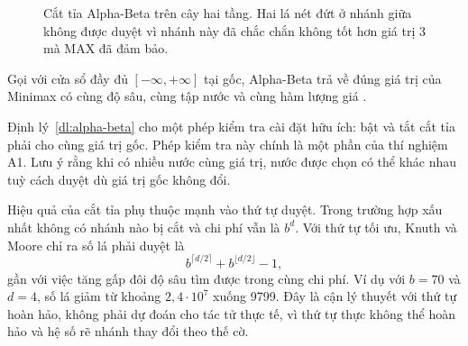 \begin{figure}[!htb]
  \centering
  \caption{Cắt tỉa Alpha-Beta trên cây hai tầng. Hai lá nét đứt ở nhánh giữa không được duyệt vì nhánh này đã chắc chắn không tốt hơn giá trị 3 mà MAX đã đảm bảo.}
  \label{fig:lt-cat-tia}
\end{figure}

\begin{dinhly}
\label{dl:alpha-beta}
Gọi với cửa sổ đầy đủ $[-\infty, +\infty]$ tại gốc, Alpha-Beta trả về đúng giá trị của Minimax có cùng độ sâu, cùng tập nước và cùng hàm lượng giá \cite{knuth1975alphabeta}.
\end{dinhly}

Định lý~\ref{dl:alpha-beta} cho một phép kiểm tra cài đặt hữu ích: bật và tắt cắt tỉa phải cho cùng giá trị gốc. Phép kiểm tra này chính là một phần của thí nghiệm A1. Lưu ý rằng khi có nhiều nước cùng giá trị, nước được chọn có thể khác nhau tuỳ cách duyệt dù giá trị gốc không đổi.

Hiệu quả của cắt tỉa phụ thuộc mạnh vào thứ tự duyệt. Trong trường hợp xấu nhất không có nhánh nào bị cắt và chi phí vẫn là $b^d$. Với thứ tự tối ưu, Knuth và Moore \cite{knuth1975alphabeta} chỉ ra số lá phải duyệt là
\begin{equation}
  b^{\lceil d/2 \rceil} + b^{\lfloor d/2 \rfloor} - 1,
  \label{eq:knuth-moore}
\end{equation}
gần với việc tăng gấp đôi độ sâu tìm được trong cùng chi phí. Ví dụ với $b = 70$ và $d = 4$, số lá giảm từ khoảng $2{,}4 \cdot 10^{7}$ xuống \num{9799}. Đây là cận lý thuyết với thứ tự hoàn hảo, không phải dự đoán cho tác tử thực tế, vì thứ tự thực không thể hoàn hảo và hệ số rẽ nhánh thay đổi theo thế cờ.

